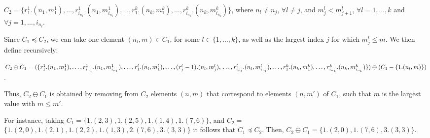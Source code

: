\begin{itemize}
\begin{itemize}
        \noindent $C_2 = \{ r^1_1.(n_1,m^1_1), \ldots,
         r^1_{i_{n_{1}}}.(n_1,m^1_{i_{n_{1}}}),
        \ldots, r^k_1.(n_k,m^k_1),\ldots, r^k_{i_{n_{k}}}.(n_k,m^k_{i_{n_{k}}}) \}$,
        where $n_l \neq n_j$, $\forall l \neq j$, and
        $m^l_j < m^l_{j+1}$, $\forall l=1,\ldots,k$ and $\forall
        j=1,\ldots,i_{n_{l}}$.

        Since $C_1 \preceq C_2$, we can take one element $(n_l,m) \in C_1$, 
        for some $l\in \{1,\ldots,k\}$, as well as the largest index $j$
        for which $m^l_{j} \leq m$. We then define recursively:
       
        \noindent $C_2 \ominus C_1 = %
        (
        \{ r^1_1.(n_1,m^1_1), \ldots, r^1_{i_{n_{1}}}.(n_1,m^1_{i_{n_{1}}}),
        \ldots,
        r^l_1.(n_l,m^l_1), \ldots,(r^l_{j} - 1).(n_l,m^l_j),\\
        \ldots,
        r^l_{i_{n_{l}}}.(n_l,m^l_{i_{n_{l}}}), 
        \ldots, r^k_1.(n_k,m^k_1),\ldots, r^k_{i_{n_{k}}}.(n_k,m^k_{i_{n_{k}}}) \}
        ) 
        \ominus (C_1 - \{ 1.(n_l,m) \})
        $.

        Thus, $C_2 \ominus C_1$ is obtained by removing from $C_2$ 
        elements $(n,m)$ that correspond to elements $(n,m')$ of $C_1$,
        such that $m$ is the largest value with $m\leq m'$.

        \vspace*{0.12cm}

        For instance, taking $C_1 = \{
             1.(2,3), 1.(2,5), 1.(1,4), 1.(7,6)
        \}$, and $C_2 = $ \linebreak
        $\{
             1.(2,0), 1.(2,1), 1.(2,2), 1.(1,3), 2.(7,6), 3.(3,3)
        \}$ it follows that $C_1 \preceq C_2$. Then,
        $C_2 \ominus C_1= \{
            1.(2,0), 1.(7,6), 3.(3,3)
        \}$.
  \end{itemize} 
\end{itemize}
\edfn


